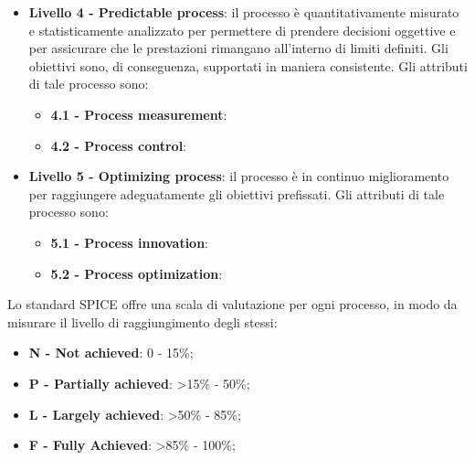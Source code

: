 \begin{itemize}
	\item \textbf {Livello 4 - Predictable process}: il processo è quantitativamente misurato e statisticamente analizzato per permettere di prendere decisioni oggettive e per assicurare che le prestazioni rimangano all'interno di limiti definiti. Gli obiettivi sono, di conseguenza, supportati in maniera consistente. Gli attributi di tale processo sono:
		\begin{itemize}
		\item \textbf{4.1 - Process measurement}:
		\item \textbf{4.2 - Process control}:
		\end{itemize}
	\item \textbf {Livello 5 - Optimizing process}: il processo è in continuo miglioramento per raggiungere adeguatamente gli obiettivi prefissati. Gli attributi di tale processo sono:
		\begin{itemize}
		\item \textbf{5.1 - Process innovation}:
		\item \textbf{5.2 - Process optimization}:
		\end{itemize}
	\end{itemize}
	
	Lo standard SPICE offre una scala di valutazione per ogni processo, in modo da misurare il livello di raggiungimento degli stessi:
	\begin{itemize}
	\item \textbf{N - Not achieved}: 0 - 15\%;
	\item \textbf{P - Partially achieved}: >15\% - 50\%;
	\item \textbf{L - Largely achieved}: >50\% - 85\%;
	\item \textbf{F - Fully Achieved}: >85\% - 100\%;
	\end{itemize}


\pagebreak